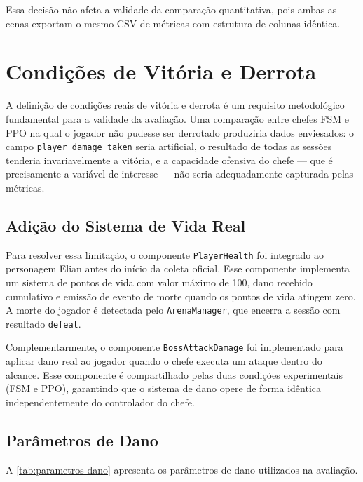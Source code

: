 Essa decisão não afeta a validade da comparação quantitativa, pois ambas as
cenas exportam o mesmo CSV de métricas com estrutura de colunas idêntica.

\section{Condições de Vitória e Derrota}
\label{sec:condicoes-vitoria-derrota}

A definição de condições reais de vitória e derrota é um requisito
metodológico fundamental para a validade da avaliação. Uma comparação entre
chefes FSM e PPO na qual o jogador não pudesse ser derrotado produziria dados
enviesados: o campo \texttt{player\_damage\_taken} seria artificial, o
resultado de todas as sessões tenderia invariavelmente a vitória, e a
capacidade ofensiva do chefe --- que é precisamente a variável de interesse
--- não seria adequadamente capturada pelas métricas.

\subsection{Adição do Sistema de Vida Real}
\label{subsec:adicao-vida-real}

Para resolver essa limitação, o componente \texttt{PlayerHealth} foi integrado
ao personagem Elian antes do início da coleta oficial. Esse componente
implementa um sistema de pontos de vida com valor máximo de 100, dano
recebido cumulativo e emissão de evento de morte quando os pontos de vida
atingem zero. A morte do jogador é detectada pelo \texttt{ArenaManager}, que
encerra a sessão com resultado \texttt{defeat}.

Complementarmente, o componente \texttt{BossAttackDamage} foi implementado
para aplicar dano real ao jogador quando o chefe executa um ataque dentro do
alcance. Esse componente é compartilhado pelas duas condições experimentais
(FSM e PPO), garantindo que o sistema de dano opere de forma idêntica
independentemente do controlador do chefe.

\subsection{Parâmetros de Dano}
\label{subsec:parametros-dano}

A \autoref{tab:parametros-dano} apresenta os parâmetros de dano utilizados na
avaliação.

